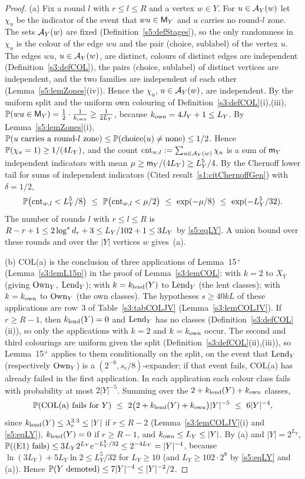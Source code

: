\begin{proof}
(a) Fix a round $l$ with $r\le l\le R$ and a vertex $w\in Y$. For $u\in\mathcal{A}_Y(w)$ let $\chi_u$ be the indicator of the event that $wu\in\mathsf{M}_Y$ and $u$ carries no round-$l$ zone. The sets $\mathcal{A}_Y(w)$ are fixed (Definition~\ref{s5:defStages}), so the only randomness in $\chi_u$ is the colour of the edge $wu$ and the pair (choice, sublabel) of the vertex $u$. The edges $wu$, $u\in\mathcal{A}_Y(w)$, are distinct, colours of distinct edges are independent (Definition~\ref{s3:defCOL}), the pairs (choice, sublabel) of distinct vertices are independent, and the two families are independent of each other (Lemma~\ref{s5:lemZones}(iv)). Hence the $\chi_u$, $u\in\mathcal{A}_Y(w)$, are independent. By the uniform split and the uniform own colouring of Definition~\ref{s3:defCOL}(i),(iii), $\mathbb{P}(wu\in\mathsf{M}_Y)=\frac12\cdot\frac1{k_{\mathrm{own}}}\ge\frac{1}{2L_Y}$, because $k_{\mathrm{own}}=4J_Y+1\le L_Y$. By Lemma~\ref{s5:lemZones}(i), $\mathbb{P}(u\text{ carries a round-$l$ zone})\le\mathbb{P}(\mathrm{choice}(u)\ne\mathrm{none})\le 1/2$. Hence $\mathbb{P}(\chi_u=1)\ge 1/(4L_Y)$, and the count $\mathrm{cnt}_{w,l}\mathrel{:=}\sum_{u\in\mathcal{A}_Y(w)}\chi_u$ is a sum of $\mathsf{m}_Y$ independent indicators with mean $\mu\ge\mathsf{m}_Y/(4L_Y)\ge L_Y^5/4$. By the Chernoff lower tail for sums of independent indicators (Cited result~\ref{s1:citChernoffGen}) with $\delta=1/2$,
\[
\Prob\bigl(\mathrm{cnt}_{w,l}<L_Y^5/8\bigr)\ \le\ \Prob\bigl(\mathrm{cnt}_{w,l}<\mu/2\bigr)\ \le\ \exp(-\mu/8)\ \le\ \exp(-L_Y^5/32).
\]
The number of rounds $l$ with $r\le l\le R$ is $R-r+1\le 2\log^{\star} d_r+3\le L_Y/102+1\le 3L_Y$ by \eqref{s5:eqLY}. A union bound over these rounds and over the $|Y|$ vertices $w$ gives~(a).

(b) COL(a) is the conclusion of three applications of Lemma~15$^+$ (Lemma~\ref{s3:lemL15p}) in the proof of Lemma~\ref{s3:lemCOL}: with $k=2$ to $X_Y$ (giving $\mathrm{Own}_Y$, $\mathrm{Lend}_Y$); with $k=k_{\mathrm{lend}}(Y)$ to $\mathrm{Lend}_Y$ (the lent classes); with $k=k_{\mathrm{own}}$ to $\mathrm{Own}_Y$ (the own classes). The hypotheses $s\ge 40kL$ of these applications are row~3 of Table~\ref{s3:tabCOLJV} (Lemma~\ref{s3:lemCOLJV}). If $r\ge R-1$, then $k_{\mathrm{lend}}(Y)=0$ and $\mathrm{Lend}_Y$ has no classes (Definition~\ref{s3:defCOL}(ii)), so only the applications with $k=2$ and $k=k_{\mathrm{own}}$ occur. The second and third colourings are uniform given the split (Definition~\ref{s3:defCOL}(ii),(iii)), so Lemma~15$^+$ applies to them conditionally on the split, on the event that $\mathrm{Lend}_Y$ (respectively $\mathrm{Own}_Y$) is a $(2^{-6},s_r/8)$-expander; if that event fails, COL(a) has already failed in the first application. In each application each colour class fails with probability at most $2|Y|^{-5}$. Summing over the $2+k_{\mathrm{lend}}(Y)+k_{\mathrm{own}}$ classes,
\[
\Prob(\text{COL(a) fails for }Y)\ \le\ 2\bigl(2+\klend(Y)+\kown\bigr)|Y|^{-5}\ \le\ 6|Y|^{-4},
\]
since $k_{\mathrm{lend}}(Y)\le\lambda_r^{3.3}\le|Y|$ if $r\le R-2$ (Lemma~\ref{s3:lemCOLJV}(i) and \eqref{s5:eqLY}), $k_{\mathrm{lend}}(Y)=0$ if $r\ge R-1$, and $k_{\mathrm{own}}\le L_Y\le|Y|$. By (a) and $|Y|=2^{L_Y}$, $\mathbb{P}(\text{(E1) fails})\le 3L_Y2^{L_Y}e^{-L_Y^5/32}\le 2^{-4L_Y}=|Y|^{-4}$, because $\ln(3L_Y)+5L_Y\ln2\le L_Y^5/32$ for $L_Y\ge 10$ (and $L_Y\ge 102\cdot 2^8$ by \eqref{s5:eqLY} and (a)). Hence $\mathbb{P}(Y\text{ demoted})\le 7|Y|^{-4}\le|Y|^{-2}/2$.


\end{proof}

